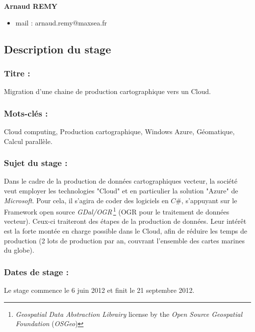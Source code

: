 \textbf{Arnaud REMY}
\begin{itemize}
\item mail : arnaud.remy@maxsea.fr
\end{itemize}



\subsection{Description du stage}
\subsubsection*{Titre :} 
{\centering Migration d'une chaine de production cartographique
  vers un Cloud. \\}

\subsubsection*{Mots-clés :}
{\centering Cloud computing, Production cartographique, Windows Azure,
  Géomatique, Calcul parallèle. \\}

\subsubsection*{Sujet du stage :}
Dans le cadre de la production de données cartographiques vecteur, la
société \maxsea veut employer les technologies "Cloud" et en
particulier la solution "Azure" de \textit{Microsoft}. Pour cela, il
s’agira de coder des logiciels en $C\#$, s’appuyant sur le Framework
open source \textit{GDal/OGR}\,\footnote{\textit{Geospatial Data
    Abstraction Librairy} license by the \textit{Open Source
    Geospatial Foundation} (\textit{OSGeo})} (OGR pour le traitement
de données vecteur). Ceux-ci traiteront des étapes de la production de
données. Leur intérêt est la forte montée en charge possible dans le
Cloud, afin de réduire les temps de production (2 lots de production
par an, couvrant l’ensemble des cartes marines du globe).

\subsubsection*{Dates de stage :}
Le stage commence le 6 juin 2012 et finit le 21 septembre 2012.
